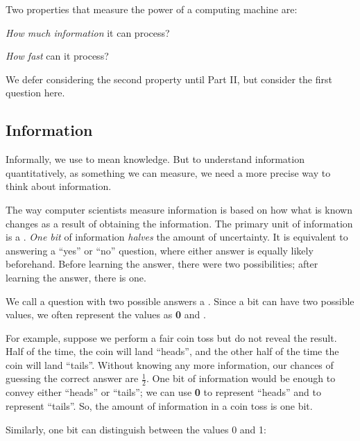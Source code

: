 Two properties that measure the power of a computing machine are:
\begin{enumtight}
\item {\em How much information} it can process?  
\item {\em How fast} can it process?  
\end{enumtight}

We defer considering the second property until Part II, but consider the first question here.  

\subsection{Information}\label{sec:information}

Informally, we use  to mean knowledge.  But to understand information quantitatively, as something we can measure, we need a more precise way to think about information.  

The way computer scientists measure information is based on how what is known changes as a result of obtaining the information.  The primary unit of information is a .  {\em One bit} of information {\em halves} the amount of uncertainty.  It is equivalent to answering a ``yes'' or ``no'' question, where either answer is equally likely beforehand.  Before learning the answer, there were two possibilities; after learning the answer, there is one.  

We call a question with two possible answers a .  Since a bit can have two possible values, we often represent the values as {\bf 0} and .

For example, suppose we perform a fair coin toss but do not reveal the result.  Half of the time, the coin will land ``heads'', and the other half of the time the coin will land ``tails''.  Without knowing any more information, our chances of guessing the correct answer are $\frac{1}{2}$.  One bit of information would be enough to convey either ``heads'' or ``tails''; we can use {\bf 0} to represent ``heads'' and  to represent ``tails''.  So, the amount of information in a coin toss is one bit.  

Similarly, one bit can distinguish between the values 0 and 1:

